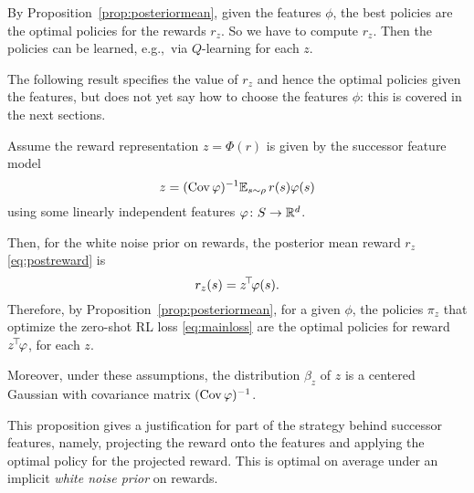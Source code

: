 \documentclass[11pt,a4paper]{article}
\newcommand{\TODO}[1]{{\color{red} TODO: {#1}}}
\begin{document}
By Proposition~\ref{prop:posteriormean}, given the features $\phi$, the
best policies are the optimal policies for the rewards $r_z$. So we 
have to compute $r_z$. Then the policies can be learned, e.g.,\ via
$Q$-learning for each $z$.

The following result specifies the value of $r_z$ and hence the optimal
policies given the features, but does not yet say how to choose the
features $\phi$: this is covered in the next sections.

\begin{prop}
\label{prop:linearpostmean}
Assume the reward representation $z=\Phi(r)$ is given by the successor
feature model
\begin{equation}
\label{eq:SF}
z=(\operatorname{Cov} \varphi)^{-1} \mathbb{E}_{s\sim \rho} \,r(s)\varphi(s)
\end{equation}
using some linearly independent features $\varphi\colon S \to {\mathbb{R}}^d$.

Then, for the white noise prior on rewards, the posterior mean 
reward $r_z$ \eqref{eq:postreward} is
\begin{equation}
\label{eq:rz}
r_z(s)=z^{\!\top}\!\varphi(s).
\end{equation}
Therefore, by Proposition~\ref{prop:posteriormean}, for a given $\phi$, the policies $\pi_z$ that optimize the
zero-shot RL loss \eqref{eq:mainloss} are the
optimal policies for reward $z^{\!\top}\!\varphi$, for each $z$.

Moreover, under these assumptions, the distribution $\beta_z$ of $z$ is a centered Gaussian with
covariance matrix $(\operatorname{Cov} \varphi)^{-1}$.
\end{prop}

This proposition gives a justification for part of the strategy behind
successor features, namely, projecting the reward onto the features and
applying the optimal policy for the projected reward. This is optimal on
average under
an implicit \emph{white noise prior} on rewards. 

\end{document}

